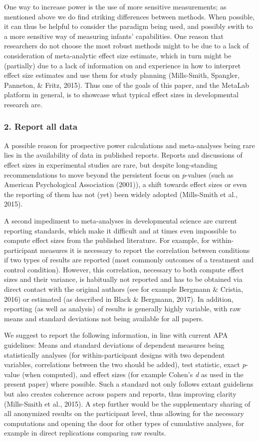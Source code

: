 \documentclass[english,floatsintext,man]{apa6}
\newcounter{author}
\begin{document}
One way to increase power is the use of more sensitive measurements; as
mentioned above we do find striking differences between methods. When
possible, it can thus be helpful to consider the paradigm being used,
and possibly swith to a more sensitive way of measuring infants'
capabilities. One reason that researchers do not choose the most robust
methods might to be due to a lack of consideration of meta-analytic
effect size estimate, which in turn might be (partially) due to a lack
of information on and experience in how to interpret effect size
estimates and use them for study planning (Mills-Smith, Spangler,
Panneton, \& Fritz, 2015). Thus one of the goals of this paper, and the
MetaLab platform in general, is to showcase what typical effect sizes in
developmental research are.

\subsubsection{2. Report all data}\label{report-all-data}

A possible reason for prospective power calculations and meta-analyses
being rare lies in the availability of data in published reports.
Reports and discussions of effect sizes in experimental studies are
rare, but despite long-standing recommendations to move beyond the
persistent focus on \emph{p}-values (such as American Psychological
Association (2001)), a shift towards effect sizes or even the reporting
of them has not (yet) been widely adopted (Mills-Smith et al., 2015).

A second impediment to meta-analyses in developmental science are
current reporting standards, which make it difficult and at times even
impossible to compute effect sizes from the published literature. For
example, for within-participant measures it is necessary to report the
correlation between conditions if two types of results are reported
(most commonly outcomes of a treatment and control condition). However,
this correlation, necessary to both compute effect sizes and their
variance, is habitually not reported and has to be obtained via direct
contact with the original authors (see for example Bergmann \& Cristia,
2016) or estimated (as described in Black \& Bergmann, 2017). In
addition, reporting (as well as analysis) of results is generally highly
variable, with raw means and standard deviations not being available for
all papers.

We suggest to report the following information, in line with current APA
guidelines: Means and standard deviations of dependent measures being
statistically analyses (for within-participant designs with two
dependent variables, correlations between the two should be added), test
statistic, exact \emph{p}-value (when computed), and effect sizes (for
example Cohen's \emph{d} as used in the present paper) where possible.
Such a standard not only follows extant guideliens but also creates
coherence across papers and reports, thus improving clarity (Mills-Smith
et al., 2015). A step further would be the supplementary sharing of all
anonymized results on the participant level, thus allowing for the
necessary computations and opening the door for other types of
cumulative analyses, for example in direct replications comparing raw
results.
\end{document}
